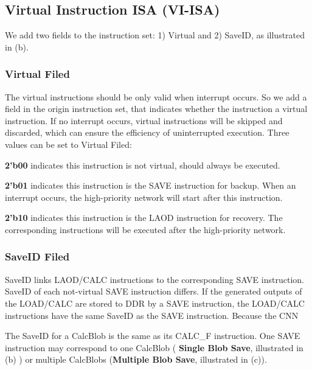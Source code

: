 \subsection{Virtual Instruction ISA (VI-ISA) }
\label{sec:virtualinstr}

We add two fields to the instruction set: 1) Virtual and 2) SaveID, as illustrated in (b). 

\subsubsection{ Virtual Filed}

The virtual instructions should be only valid when interrupt occurs. So we add a field in the origin instruction set, that indicates whether the instruction a virtual instruction. If no interrupt occurs, virtual instructions will be skipped and discarded, which can ensure the efficiency of uninterrupted execution. Three values can be set to Virtual Filed:

	\textbf{2'b00} indicates this instruction is not virtual, should always be executed.
	
	\textbf{2'b01} indicates this instruction is the SAVE instruction for backup. When an interrupt occurs, the high-priority network will start after this instruction.

    \textbf{2'b10} indicates this instruction is the LAOD instruction for recovery. The corresponding instructions will be executed after the high-priority network.

\subsubsection{ SaveID Filed }

SaveID links LAOD/CALC instructions to the corresponding SAVE instruction. SaveID of each not-virtual SAVE instruction differs. If the generated outputs of the LOAD/CALC are stored to DDR by a SAVE instruction, the LOAD/CALC instructions have the same SaveID as the SAVE instruction. Because the CNN 

The SaveID for a CalcBlob is the same as its CALC\_F instruction.
One SAVE instruction may correspond to one CalcBlob ( \textbf{Single Blob Save}, illustrated in (b) ) or multiple CalcBlobs (\textbf{Multiple Blob Save}, illustrated in (c)).

